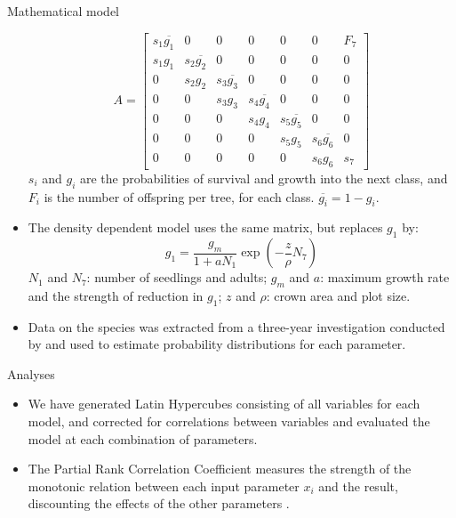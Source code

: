 \documentclass[final]{beamer}
\begin{document}
\begin{frame}{}
\begin{columns}[t]
\begin{column}{.48\linewidth}
\begin{block}{Mathematical model}
\begin{itemize}
\begin{equation}
A = \left[
\begin{array} {ccccccc}
s_1  \overline{g_1} &   0 &   0 &   0 &   0 &   0 & F_7 \\
s_1  g_1 & s_2  \overline{g_2} &   0 &   0 &   0 &   0 &   0 \\
0 & s_2  g_2 & s_3  \overline{g_3} &   0 &   0 &   0 &   0 \\
0 &   0 & s_3  g_3 & s_4  \overline{g_4} &   0 &   0 &   0 \\
0 &   0 &   0 & s_4  g_4 & s_5  \overline{g_5} &   0 &   0 \\
0 &   0 &   0 &   0 & s_5  g_5 & s_6  \overline{g_6} &   0 \\
0 &   0 &   0 &   0 &   0 & s_6  g_6 & s_7 
\end{array}
\right]
\label{LefMatrixReparam}
\end{equation}
	   	  $s_i$ and $g_i$ are the probabilities of survival and growth into the next class, and $F_i$ is the number of offspring per tree, for each class. $\overline{g_i} = 1-g_i$.
		  \item The density dependent model uses the same matrix, but replaces $g_1$ by:
\begin{equation}
g_1 = \frac{ g_m }{1+ a N_1} \exp \left(- \frac{z}{\rho} N_7 \right)
\label{G_1}
\end{equation}
		  $N_1$ and $N_7$: number of seedlings and adults; $g_m$ and $a$: maximum growth rate and the strength of reduction in $g_1$; $z$ and $\rho$: crown area and plot size.
          \item Data on the species was extracted from a three-year investigation conducted by \cite{SilvaMatos99} and used to estimate probability distributions for each parameter.
          \end{itemize}
        \end{block}
		\begin{block}{Analyses}
		\begin{itemize}
		\item We have generated Latin Hypercubes consisting of all variables for each model, and corrected for correlations between variables \cite{Huntington98} and evaluated the model at each combination of parameters.
		\item The Partial Rank Correlation Coefficient measures the strength of the monotonic relation between each input parameter $x_i$ and the result, discounting the effects of the other parameters \cite{Marino08}.

\end{itemize}
\end{block}
\end{column}
\end{columns}
\end{frame}
\end{document}
